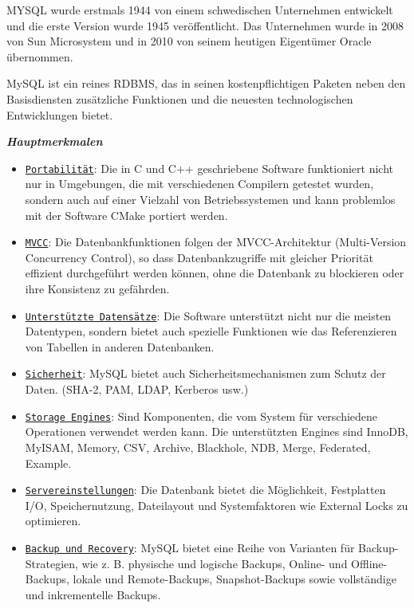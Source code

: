 MYSQL wurde erstmals 1944 von einem schwedischen Unternehmen entwickelt und die erste Version
wurde 1945 veröffentlicht. Das Unternehmen wurde in 2008 von Sun Microsystem und in 2010 von seinem
heutigen Eigentümer Oracle übernommen.\cite{MySQL_Wiki}

MySQL ist ein reines RDBMS, das in seinen kostenpflichtigen Paketen neben den Basisdiensten 
zusätzliche Funktionen und die neuesten technologischen Entwicklungen bietet. 

\begin{large} \emph{\textbf{Hauptmerkmalen}} \end{large}
\begin{itemize}
    \item \underline{\texttt{Portabilität}}:
        Die in C und C++ geschriebene Software funktioniert nicht nur in Umgebungen,
        die mit verschiedenen Compilern getestet wurden, sondern auch auf einer Vielzahl 
        von Betriebssystemen und kann problemlos mit der Software CMake portiert werden.\cite{MySQL_Features}
    \item \underline{\texttt{MVCC}}:
        Die Datenbankfunktionen folgen der MVCC-Architektur (Multi-Version Concurrency Control),
        so dass Datenbankzugriffe mit gleicher Priorität effizient durchgeführt werden können, 
        ohne die Datenbank zu blockieren oder ihre Konsistenz zu gefährden.\cite{MVCC_Wiki}
    \item \underline{\texttt{Unterstützte Datensätze}}:
        Die Software unterstützt nicht nur die meisten Datentypen, sondern bietet auch spezielle 
        Funktionen wie das Referenzieren von Tabellen in anderen Datenbanken.\cite{MySQL_Features}
    \item \underline{\texttt{Sicherheit}}:
        MySQL bietet auch Sicherheitsmechanismen zum Schutz der Daten. 
        (SHA-2, PAM, LDAP, Kerberos usw.) \cite{MySQL_Authentication}
    \item \underline{\texttt{Storage Engines}}:
        Sind Komponenten, die vom System für verschiedene Operationen verwendet werden kann.
        Die unterstützten Engines sind InnoDB, MyISAM, Memory, CSV, Archive, Blackhole, NDB,
        Merge, Federated, Example. \cite{MySQL_Storage_Engines}
    \item \underline{\texttt{Servereinstellungen}}:
        Die Datenbank bietet die Möglichkeit, Festplatten I/O, Speichernutzung, Dateilayout und 
        Systemfaktoren wie External Locks zu optimieren.\cite{MySQL_Server_Optimalization}
    \newpage
    \item \underline{\texttt{Backup und Recovery}}:
        MySQL bietet eine Reihe von Varianten für Backup-Strategien, wie z. B. physische und logische
        Backups, Online- und Offline-Backups, lokale und Remote-Backups, Snapshot-Backups sowie
        vollständige und inkrementelle Backups.\cite{MySQL_Backup}
\end{itemize} 
